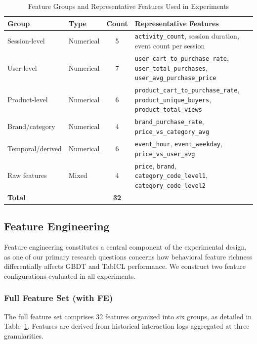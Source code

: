 \documentclass[conference]{IEEEtran}
\begin{document}
\begin{table}[!t]
\caption{Feature Groups and Representative Features Used in Experiments}
\label{tab:feature_groups}
\centering
\setlength{\tabcolsep}{5pt}
\begin{tabularx}{\textwidth}{llcX}
\toprule
\textbf{Group} & \textbf{Type} & \textbf{Count} 
               & \textbf{Representative Features} \\
\midrule
Session-level     & Numerical   & 5 
  & \texttt{activity\_count}, session duration, 
    event count per session \\
\addlinespace
User-level        & Numerical   & 7 
  & \texttt{user\_cart\_to\_purchase\_rate}, 
    \texttt{user\_total\_purchases}, 
    \texttt{user\_avg\_purchase\_price} \\
\addlinespace
Product-level     & Numerical   & 6 
  & \texttt{product\_cart\_to\_purchase\_rate}, 
    \texttt{product\_unique\_buyers}, 
    \texttt{product\_total\_views} \\
\addlinespace
Brand/category    & Numerical   & 4 
  & \texttt{brand\_purchase\_rate}, 
    \texttt{price\_vs\_category\_avg} \\
\addlinespace
Temporal/derived  & Numerical   & 6 
  & \texttt{event\_hour}, 
    \texttt{event\_weekday}, 
    \texttt{price\_vs\_user\_avg} \\
\addlinespace
Raw features      & Mixed       & 4 
  & \texttt{price}, \texttt{brand}, 
    \texttt{category\_code\_level1}, 
    \texttt{category\_code\_level2} \\
\midrule
\textbf{Total}    &             & \textbf{32} & \\
\bottomrule
\end{tabularx}
\end{table}

\subsection{Feature Engineering}

Feature engineering constitutes a central component of the 
experimental design, as one of our primary research questions 
concerns how behavioral feature richness differentially affects 
GBDT and TabICL performance. We construct two feature 
configurations evaluated in all experiments.

\subsubsection{Full Feature Set (with FE)}
The full feature set comprises 32 features organized into six 
groups, as detailed in Table~\ref{tab:feature_groups}. Features 
are derived from historical interaction logs aggregated at three 
granularities.
\end{document}
